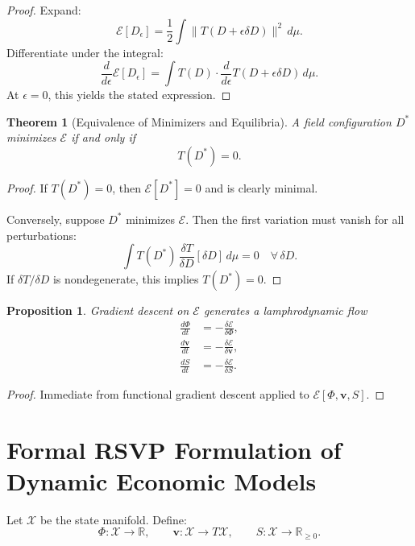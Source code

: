 \documentclass[12pt]{article}
\newtheorem{theorem}{Theorem}
\newtheorem{proposition}{Proposition}
\begin{document}
\begin{proof}
Expand:
\[
\mathcal{E}[D_\epsilon]
= \frac{1}{2}\int \|T(D + \epsilon \delta D)\|^2\,d\mu.
\]
Differentiate under the integral:
\[
\frac{d}{d\epsilon}
\mathcal{E}[D_\epsilon]
= \int T(D) \cdot \frac{d}{d\epsilon}T(D+\epsilon\delta D)\, d\mu.
\]
At $\epsilon=0$, this yields the stated expression.
\end{proof}

\begin{theorem}[Equivalence of Minimizers and Equilibria]
A field configuration $D^\ast$ minimizes $\mathcal{E}$ if and only if
\[
T(D^\ast)=0.
\]
\end{theorem}

\begin{proof}
If $T(D^\ast)=0$, then $\mathcal{E}[D^\ast]=0$ and is clearly minimal.

Conversely, suppose $D^\ast$ minimizes $\mathcal{E}$. Then the first 
variation must vanish for all perturbations:
\[
\int T(D^\ast)\,
\frac{\delta T}{\delta D}[\delta D]\, d\mu = 0
\quad \forall\,\delta D.
\]
If $\delta T/\delta D$ is nondegenerate, this implies $T(D^\ast)=0$.
\end{proof}

\begin{proposition}
Gradient descent on $\mathcal{E}$ generates a lamphrodynamic flow
\begin{equation}
\begin{aligned}
\frac{d\Phi}{dt} &= - \frac{\delta \mathcal{E}}{\delta \Phi},\\
\frac{d\mathbf{v}}{dt} &= - \frac{\delta \mathcal{E}}{\delta \mathbf{v}},\\
\frac{dS}{dt} &= - \frac{\delta \mathcal{E}}{\delta S}.
\end{aligned}
\end{equation}
\end{proposition}

\begin{proof}
Immediate from functional gradient descent applied to 
$\mathcal{E}[\Phi, \mathbf{v}, S]$.
\end{proof}

\section{Formal RSVP Formulation of Dynamic Economic Models}

Let $\mathcal{X}$ be the state manifold. Define:
\[
\Phi: \mathcal{X}\to\mathbb{R}, \qquad
\mathbf{v}: \mathcal{X}\to T\mathcal{X}, \qquad
S: \mathcal{X}\to\mathbb{R}_{\ge 0}.
\]
\end{document}
